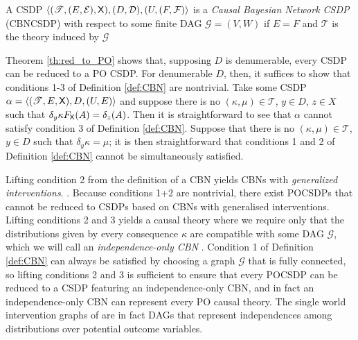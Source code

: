 \begin{definition}
A CSDP $\langle (\mathscr{T},(E,\mathcal{E}),\mathsf{X}),(D,\mathcal{D}), (U,(F,\mathcal{F})\rangle$ is a \emph{Causal Bayesian Network CSDP} (CBNCSDP) with respect to some finite DAG $\mathcal{G}=(V,W)$ if $E=F$ and $\mathscr{T}$ is the theory induced by $\mathcal{G}$ 

Theorem \ref{th:red_to_PO} shows that, supposing $D$ is denumerable, every CSDP can be reduced to a PO CSDP. For denumerable $D$, then, it suffices to show that conditions 1-3 of Definition \ref{def:CBN} are nontrivial. Take some CSDP $\alpha=\langle (\mathscr{T},E,\mathsf{X}),D,(U,E) \rangle$ and suppose there is no $(\kappa,\mu)\in \mathscr{T}$, $y\in D$, $z\in X$ such that $\delta_y\kappa F_{\mathsf{X}} (A) = \delta_{z} (A)$. Then it is straightforward to see that $\alpha$ cannot satisfy condition 3 of Definition \ref{def:CBN}. Suppose that there is no $(\kappa,\mu)\in \mathscr{T}$, $y\in D$ such that $\delta_y \kappa = \mu$; it is then straightforward that conditions 1 and 2 of Definition \ref{def:CBN} cannot be simultaneously satisfied.  

Lifting condition 2 from the definition of a CBN yields CBNs with \emph{generalized interventions}. . Because conditions 1+2 are nontrivial, there exist POCSDPs that cannot be reduced to CSDPs based on CBNs with generalised interventions. Lifting conditions 2 and 3 yields a causal theory where we require only that the distributions given by every consequence $\kappa$ are compatible with some DAG $\mathcal{G}$, which we will call an \emph{independence-only CBN} . Condition 1 of Definition \ref{def:CBN} can always be satisfied by choosing a graph $\mathcal{G}$ that is fully connected, so lifting conditions 2 and 3 is sufficient to ensure that every POCSDP can be reduced to a CSDP featuring an independence-only CBN, and in fact an independence-only CBN can represent every PO causal theory. The single world intervention graphs of \citet{richardson2013single} are in fact DAGs that represent independences among distributions over potential outcome variables.


\end{definition}
